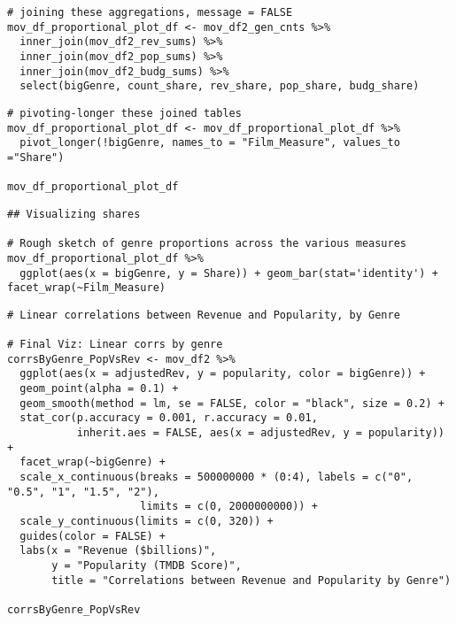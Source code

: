 \begin{lstlisting}
# joining these aggregations, message = FALSE
mov_df_proportional_plot_df <- mov_df2_gen_cnts %>%
  inner_join(mov_df2_rev_sums) %>%
  inner_join(mov_df2_pop_sums) %>%
  inner_join(mov_df2_budg_sums) %>%
  select(bigGenre, count_share, rev_share, pop_share, budg_share)
\end{lstlisting}

\begin{lstlisting}
# pivoting-longer these joined tables
mov_df_proportional_plot_df <- mov_df_proportional_plot_df %>%
  pivot_longer(!bigGenre, names_to = "Film_Measure", values_to ="Share")

mov_df_proportional_plot_df
\end{lstlisting}

\begin{lstlisting}
## Visualizing shares

# Rough sketch of genre proportions across the various measures
mov_df_proportional_plot_df %>%
  ggplot(aes(x = bigGenre, y = Share)) + geom_bar(stat='identity') + facet_wrap(~Film_Measure)
\end{lstlisting}

\begin{lstlisting}
# Linear correlations between Revenue and Popularity, by Genre

# Final Viz: Linear corrs by genre
corrsByGenre_PopVsRev <- mov_df2 %>%
  ggplot(aes(x = adjustedRev, y = popularity, color = bigGenre)) +
  geom_point(alpha = 0.1) +
  geom_smooth(method = lm, se = FALSE, color = "black", size = 0.2) +
  stat_cor(p.accuracy = 0.001, r.accuracy = 0.01,
           inherit.aes = FALSE, aes(x = adjustedRev, y = popularity)) +
  facet_wrap(~bigGenre) +
  scale_x_continuous(breaks = 500000000 * (0:4), labels = c("0", "0.5", "1", "1.5", "2"),
                     limits = c(0, 2000000000)) +
  scale_y_continuous(limits = c(0, 320)) +
  guides(color = FALSE) +
  labs(x = "Revenue ($billions)",
       y = "Popularity (TMDB Score)",
       title = "Correlations between Revenue and Popularity by Genre")

corrsByGenre_PopVsRev
\end{lstlisting}

